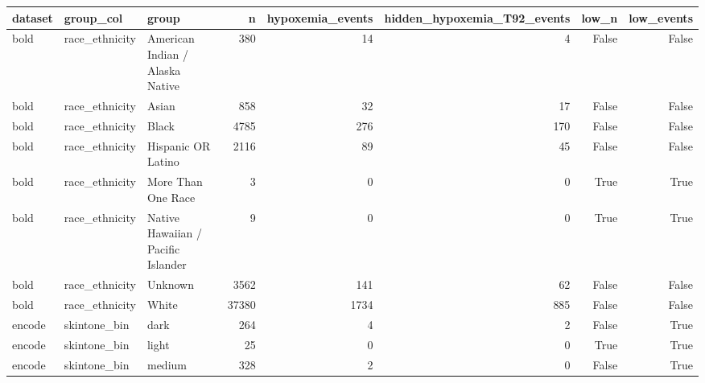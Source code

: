 \begin{tabular}{lllrrrrr}
\toprule
dataset & group\_col & group & n & hypoxemia\_events & hidden\_hypoxemia\_T92\_events & low\_n & low\_events \\
\midrule
bold & race\_ethnicity & American Indian / Alaska Native & 380 & 14 & 4 & False & False \\
bold & race\_ethnicity & Asian & 858 & 32 & 17 & False & False \\
bold & race\_ethnicity & Black & 4785 & 276 & 170 & False & False \\
bold & race\_ethnicity & Hispanic OR Latino & 2116 & 89 & 45 & False & False \\
bold & race\_ethnicity & More Than One Race & 3 & 0 & 0 & True & True \\
bold & race\_ethnicity & Native Hawaiian / Pacific Islander & 9 & 0 & 0 & True & True \\
bold & race\_ethnicity & Unknown & 3562 & 141 & 62 & False & False \\
bold & race\_ethnicity & White & 37380 & 1734 & 885 & False & False \\
encode & skintone\_bin & dark & 264 & 4 & 2 & False & True \\
encode & skintone\_bin & light & 25 & 0 & 0 & True & True \\
encode & skintone\_bin & medium & 328 & 2 & 0 & False & True \\
\bottomrule
\end{tabular}

